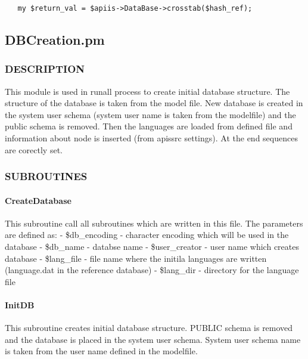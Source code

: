 \begin{verbatim}
   my $return_val = $apiis->DataBase->crosstab($hash_ref);
\end{verbatim}
\subsection{DBCreation.pm\label{DBCreation_pm}}




\subsubsection*{DESCRIPTION\label{DBCreation_pm_DESCRIPTION}}


This module is used in runall process to create initial database structure. The structure of the database 
is taken from the model file. New database is created in the system user schema (system user name is 
taken from the modelfile) and the public schema is removed. Then the languages are loaded from 
defined file and information about node is inserted (from apissrc settings). At the end sequences are
corectly set.

\subsubsection*{SUBROUTINES\label{DBCreation_pm_SUBROUTINES}}
\paragraph*{CreateDatabase\label{DBCreation_pm_CreateDatabase}}


This subroutine call all subroutines which are written in this file. The parameters are defined as:
- \$db\_encoding  -  character encoding which will be used in the database 
- \$db\_name - databse name
- \$user\_creator - user name which creates database
- \$lang\_file -  file name where the initila languages are written (language.dat in the reference database) 
- \$lang\_dir - directory for the language file

\paragraph*{InitDB\label{DBCreation_pm_InitDB}}


This subroutine creates initial database structure. PUBLIC schema is removed and the database 
is placed in the system user schema. System user schema name is taken from the user name
defined in the modelfile.

